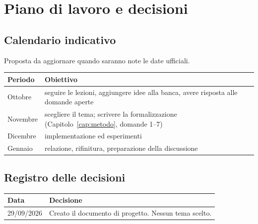 \documentclass[11pt, a4paper, oneside, openany]{book}
\begin{document}
\chapter{Piano di lavoro e decisioni}

\section{Calendario indicativo}

Proposta da aggiornare quando saranno note le date ufficiali.

\begin{center}
\renewcommand{\arraystretch}{1.25}
\begin{tabularx}{\linewidth}{@{}l X@{}}
\toprule
\textbf{Periodo} & \textbf{Obiettivo} \\
\midrule
Ottobre    & seguire le lezioni, aggiungere idee alla banca, avere risposta alle domande aperte \\
Novembre   & scegliere il tema; scrivere la formalizzazione (Capitolo~\ref{cap:metodo}, domande 1--7) \\
Dicembre   & implementazione ed esperimenti \\
Gennaio    & relazione, rifinitura, preparazione della discussione \\
\bottomrule
\end{tabularx}
\end{center}

\section{Registro delle decisioni}

\begin{center}
\renewcommand{\arraystretch}{1.25}
\begin{tabularx}{\linewidth}{@{}l X@{}}
\toprule
\textbf{Data} & \textbf{Decisione} \\
\midrule
29/09/2026 & Creato il documento di progetto. Nessun tema scelto. \\
\bottomrule
\end{tabularx}
\end{center}
\end{document}
